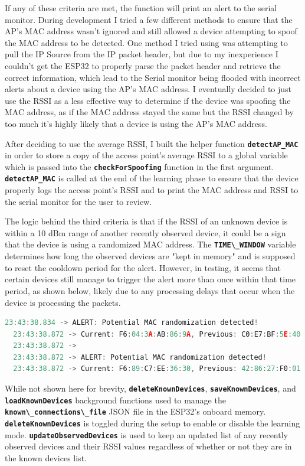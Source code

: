 \documentclass[letterpaper, 11pt]{article}
\begin{document}
\indent If any of these criteria are met, the function will print an alert to the serial monitor. During development I tried a few different methods to ensure that the AP's MAC address wasn't ignored and still
allowed a device attempting to spoof the MAC address to be detected. One method I tried using was attempting to pull the IP Source from the IP packet header, but due to my inexperience I couldn't get 
the ESP32 to properly parse the packet header and retrieve the correct information, which lead to the Serial monitor being flooded with incorrect alerts about a device using the AP's MAC address. 
I eventually decided to just use the RSSI as a less effective way to determine if the device was spoofing the MAC address, as if the MAC address stayed the same but the RSSI changed by too much it's 
highly likely that a device is using the AP's MAC address.

\indent After deciding to use the average RSSI, I built the helper function \textbf{\lstinline[]|detectAP_MAC|} in order to store a copy of the access point's average RSSI to a global variable
which is passed into the \textbf{\lstinline[]|checkForSpoofing|} function in the first argument. \textbf{\lstinline[]|detectAP_MAC|} is called at the end of the learning phase to ensure that the 
device properly logs the access point's RSSI and to print the MAC address and RSSI to the serial monitor for the user to review.

\indent The logic behind the third criteria is that if the RSSI of an unknown device is within a 10 dBm range
of another recently observed device, it could be a sign that the device is using a randomized MAC address. The \textbf{\lstinline[]|TIME\_WINDOW|} variable determines how long the observed devices are "kept in memory" 
and is supposed to reset the cooldown period for the alert. However, in testing, it seems that certain devices still manage to trigger the alert more than once within that time period, as shown below, 
likely due to any processing delays that occur when the device is processing the packets. 

\vspace{2mm}
\begin{lstlisting}[language=C++, caption=Serial Output for Spoof Detection, label=lst:spoof detector serial output]
  23:43:38.834 -> ALERT: Potential MAC randomization detected!
  23:43:38.872 -> Current: F6:04:3A:AB:86:9A, Previous: C0:E7:BF:5E:40:C6
  23:43:38.872 -> 
  23:43:38.872 -> ALERT: Potential MAC randomization detected!
  23:43:38.872 -> Current: F6:89:C7:EE:36:30, Previous: 42:86:27:F0:01:AE
\end{lstlisting}
\vspace{2mm}
\indent While not shown here for brevity, \textbf{\lstinline[]|deleteKnownDevices|}, \textbf{\lstinline[]|saveKnownDevices|}, and \textbf{\lstinline[]|loadKnownDevices|} background functions used to 
manage the \textbf{\lstinline[]|known\_connections\_file|} JSON file in the ESP32's onboard memory. \textbf{\lstinline[]|deleteKnownDevices|} is toggled during the setup to enable or disable the 
learning mode. \textbf{\lstinline[]|updateObservedDevices|} is used to keep an updated list of any recently observed devices and their RSSI values regardless of whether or not they are in the 
known devices list.
\end{document}
